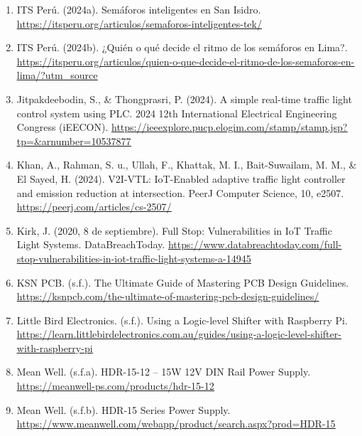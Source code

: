 \documentclass[12pt,a4paper,oneside]{report}
\providecommand{\ul}[1]{\underline{#1}}
\begin{document}
\begin{enumerate}
\item
  ITS Perú. (2024a). Semáforos inteligentes en San Isidro. \href{https://itsperu.org/articulos/semaforos-inteligentes-tek/}{\ul{https://itsperu.org/articulos/semaforos-inteligentes-tek/}}
\item
  ITS Perú. (2024b). ¿Quién o qué decide el ritmo de los semáforos en Lima?. \href{https://itsperu.org/articulos/quien-o-que-decide-el-ritmo-de-los-semaforos-en-lima/?utm_source}{\ul{https://itsperu.org/articulos/quien-o-que-decide-el-ritmo-de-los-semaforos-en-lima/?utm\_source}}
\item
  Jitpakdeebodin, S., \& Thongprasri, P. (2024). A simple real-time traffic light control system using PLC. 2024 12th International Electrical Engineering Congress (iEECON). \href{https://ieeexplore.pucp.elogim.com/stamp/stamp.jsp?tp=&arnumber=10537877}{\ul{https://ieeexplore.pucp.elogim.com/stamp/stamp.jsp?tp=\&arnumber=10537877}}
\item
  Khan, A., Rahman, S. u., Ullah, F., Khattak, M. I., Bait-Suwailam, M. M., \& El Sayed, H. (2024). V2I-VTL: IoT-Enabled adaptive traffic light controller and emission reduction at intersection. PeerJ Computer Science, 10, e2507. \href{https://peerj.com/articles/cs-2507/}{\ul{https://peerj.com/articles/cs-2507/}}
\item
  Kirk, J. (2020, 8 de septiembre). Full Stop: Vulnerabilities in IoT Traffic Light Systems. DataBreachToday. \href{https://www.databreachtoday.com/full-stop-vulnerabilities-in-iot-traffic-light-systems-a-14945}{\ul{https://www.databreachtoday.com/full-stop-vulnerabilities-in-iot-traffic-light-systems-a-14945}}
\item
  KSN PCB. (s.f.). The Ultimate Guide of Mastering PCB Design Guidelines. \href{https://ksnpcb.com/the-ultimate-of-mastering-pcb-design-guidelines/}{\ul{https://ksnpcb.com/the-ultimate-of-mastering-pcb-design-guidelines/}}
\item
  Little Bird Electronics. (s.f.). Using a Logic-level Shifter with Raspberry Pi. \href{https://learn.littlebirdelectronics.com.au/guides/using-a-logic-level-shifter-with-raspberry-pi}{\ul{https://learn.littlebirdelectronics.com.au/guides/using-a-logic-level-shifter-with-raspberry-pi}}
\item
  Mean Well. (s.f.a). HDR-15-12 -- 15W 12V DIN Rail Power Supply. \href{https://meanwell-ps.com/products/hdr-15-12}{\ul{https://meanwell-ps.com/products/hdr-15-12}}
\item
  Mean Well. (s.f.b). HDR-15 Series Power Supply. \href{https://www.meanwell.com/webapp/product/search.aspx?prod=HDR-15}{\ul{https://www.meanwell.com/webapp/product/search.aspx?prod=HDR-15}}

\end{enumerate}
\end{document}

